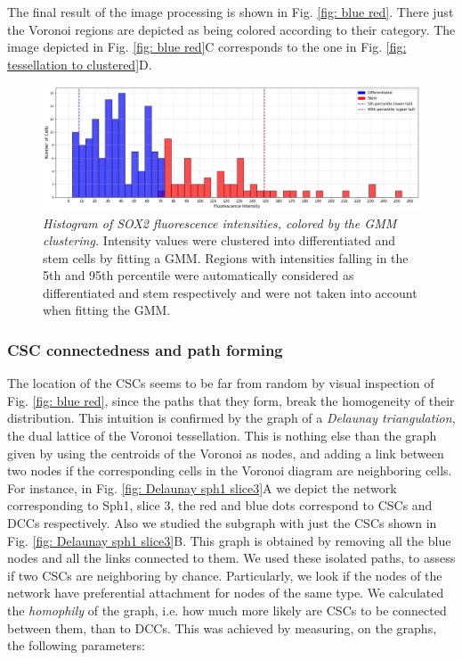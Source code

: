 \documentclass[fleqn,10pt]{wlscirep}
\begin{document}
The final result of the image processing is shown in Fig. \ref{fig: blue red}. There just the Voronoi regions are depicted as being colored according to their category. The image depicted in Fig. \ref{fig: blue red}C corresponds to the one in Fig. \ref{fig: tessellation to clustered}D. 


\begin{figure}
    \centering
    \includegraphics[width=1.0\textwidth]{images/histogram_GMM_clustering_cutting_tails_in_sph_NEW.png}
    \caption{\emph{Histogram of SOX2 fluorescence intensities, colored by the GMM clustering.} Intensity values were clustered into differentiated and stem cells by fitting a GMM. Regions with intensities falling in the 5th  and  95th percentile were automatically considered as differentiated and stem respectively and were not taken into account when fitting the GMM.}
    \label{fig: filtered GMM histogram}
\end{figure}


\subsubsection*{CSC connectedness and path forming} \label{sss: csc connectedness}
The location of the CSCs seems to be far from random by visual inspection of Fig. \ref{fig: blue red}, since the paths that they form, break the homogeneity of their distribution. This intuition is confirmed by the graph of a \emph{Delaunay triangulation}, the dual lattice of the Voronoi tessellation. This is nothing else than the graph given by using the centroids of the Voronoi as nodes, and adding a link between two nodes if the corresponding cells in the Voronoi diagram are neighboring cells. For instance, in Fig. \ref{fig: Delaunay sph1 slice3}A we depict the network corresponding to \textsf{ Sph1, slice 3}, the red and blue dots correspond to CSCs and DCCs respectively. Also we studied the subgraph with just the CSCs shown in Fig. \ref{fig: Delaunay sph1 slice3}B. This graph is obtained by removing all the blue nodes and all the links connected to them. We used these isolated paths, to assess if two CSCs are neighboring by chance. Particularly, we look if the nodes of the network have preferential attachment for nodes of the same type. We calculated the \emph{homophily} of the graph, i.e. how much more likely are CSCs to be connected between them, than to DCCs. This was achieved by measuring, on the graphs, the following parameters:
\end{document}
